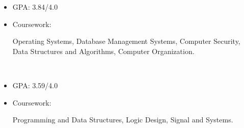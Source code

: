 \newcommand{\TUBentry}{
    \TUB
    \poswithprd{Introduction to 3D Scanning and Printing at TUB Winter University}{Jan 2018-Feb 2018}
    \begin{itemize}
        \item 
        Learned the basic of 3D scanning \& printing. Learned Blender for 3D modeling.
    \end{itemize}
}



\UM
{}
\begin{itemize}
    \item GPA: 3.84/4.0
    \item Coursework: 
    \begin{minipage}[t]{\courseworkwidth}
        Operating Systems,
        Database Management Systems,
        Computer Security,
        Data Structures and Algorithms,
        Computer Organization.
    \end{minipage}\\
\end{itemize}

\JI
{}
\begin{itemize}
    \item GPA: 3.59/4.0
    \item Coursework:
    \begin{minipage}[t]{\courseworkwidth}
        Programming and Data Structures,
        Logic Design,
        Signal and Systems.
    \end{minipage}\\
\end{itemize}
